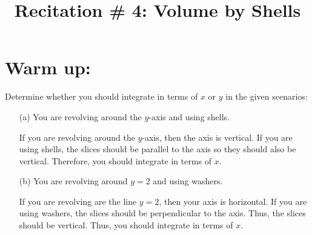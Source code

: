 \documentclass[handout]{ximera}
\title{Recitation \# 4: Volume by Shells}
\begin{document}
\begin{abstract}		\end{abstract}
\maketitle




\section{Warm up:}
\begin{problem}
Determine whether you should integrate in terms of $x$ or $y$ in the given scenarios:
\begin{itemize}

	\item[(a)] You are revolving around the $y$-axis and using shells.
	
	\begin{freeResponse}
	If you are revolving around the $y$-axis, then the axis is vertical.  If you are using shells, the slices should be parallel to the axis so they should also be vertical.  Therefore, you should integrate in terms of $x$.
	\end{freeResponse}
	
	\item[(b)] You are revolving around $y=2$ and using washers.

	\begin{freeResponse}
	If you are revolving are the line $y=2$, then your axis is horizontal.  If you are using washers, the slices should be perpendicular to the axis.  Thus, the slices should be vertical.  Thus, you should integrate in terms of $x$.
	\end{freeResponse}

\end{itemize}


\end{problem}

	
\end{document}
